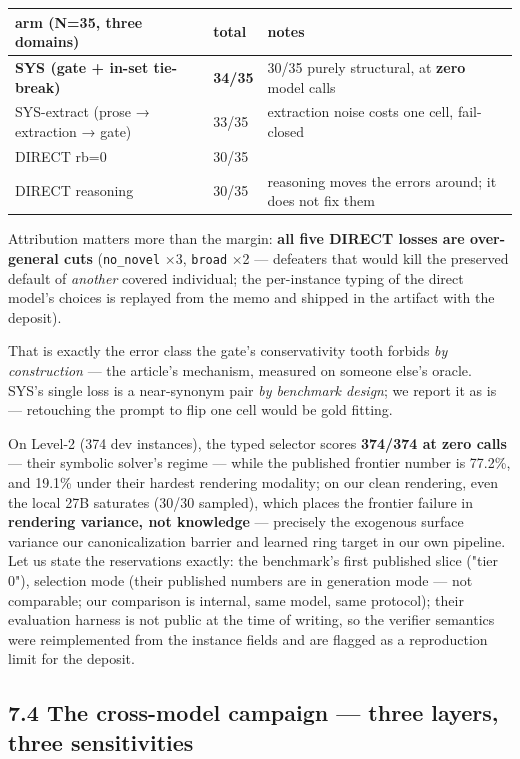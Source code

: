 \documentclass[11pt]{article}
\begin{document}
\begin{center}\small\begin{tabular}{lll}\toprule
arm (N=35, three domains) & total & notes \\ \midrule
\textbf{SYS (gate + in-set tie-break)} & \textbf{34/35} & 30/35 purely structural, at \textbf{zero} model calls \\
SYS-extract (prose → extraction → gate) & 33/35 & extraction noise costs one cell, fail-closed \\
DIRECT rb=0 & 30/35 &  \\
DIRECT reasoning & 30/35 & reasoning moves the errors around; it does not fix them \\
\bottomrule\end{tabular}\end{center}

Attribution matters more than the margin: \textbf{all five DIRECT losses are over-general cuts} (\texttt{no\_novel} ×3, \texttt{broad} ×2 — defeaters that would kill the preserved default of \emph{another} covered individual; the per-instance typing of the direct model's choices is replayed from the memo and shipped in the artifact with the deposit).

That is exactly the error class the gate's conservativity tooth forbids \emph{by construction} — the article's mechanism, measured on someone else's oracle. SYS's single loss is a near-synonym pair \emph{by benchmark design}; we report it as is — retouching the prompt to flip one cell would be gold fitting.

On Level-2 (374 dev instances), the typed selector scores \textbf{374/374 at zero calls} — their symbolic solver's regime — while the published frontier number is 77.2\%, and 19.1\% under their hardest rendering modality; on our clean rendering, even the local 27B saturates (30/30 sampled), which places the frontier failure in \textbf{rendering variance, not knowledge} — precisely the exogenous surface variance our canonicalization barrier and learned ring target in our own pipeline. Let us state the reservations exactly: the benchmark's first published slice ("tier 0"), selection mode (their published numbers are in generation mode — not comparable; our comparison is internal, same model, same protocol); their evaluation harness is not public at the time of writing, so the verifier semantics were reimplemented from the instance fields and are flagged as a reproduction limit for the deposit.

\subsection*{7.4 The cross-model campaign — three layers, three sensitivities}
\end{document}
